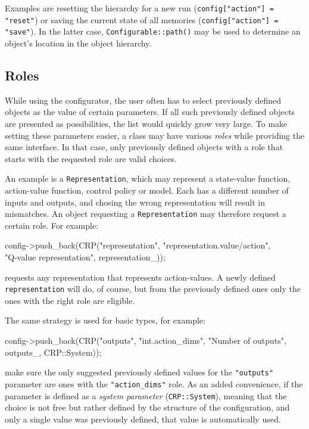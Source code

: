 \documentclass{article}
\newcommand{\txt}[1]{\texttt{#1}}
\newenvironment{code}{\alltt}{\endalltt}
\begin{document}
Examples are resetting the hierarchy for a new run (\txt{config["action"] =
"reset"}) or saving the current state of all memories (\txt{config["action"]
= "save"}). In the latter case, \txt{Configurable::path()} may be used to
determine an object's location in the object hierarchy.

\subsection{Roles}

While using the configurator, the user often has to select previously
defined objects as the value of certain parameters. If all such previously
defined objects are presented as possibilities, the list would quickly grow
very large. To make setting these parameters easier, a class may have
various \emph{roles} while providing the same interface. In that case,
only previously defined objects with a role that starts with the requested
role are valid choices.

An example is a \txt{Representation}, which may represent a state-value function,
action-value function, control policy or model. Each has a different number
of inputs and outputs, and chosing the wrong representation will result in
mismatches. An object requesting a \txt{Representation} may therefore request
a certain role. For example:

\begin{code}
config->push_back(CRP("representation", "representation.value/action",\\
                      "Q-value representation", representation_));
\end{code}

requests any representation that represents action-values. A newly
defined \txt{representation} will do, of course, but from the previously
defined ones only the ones with the right role are eligible.

The same strategy is used for basic types, for example:

\begin{code}
config->push_back(CRP("outputs", "int.action_dims",
                      "Number of outputs", outputs_, CRP::System));
\end{code}

make sure the only suggested previously defined values for the
\txt{"outputs"} parameter are ones with the \txt{"action\_dims"} role. As an added
convenience, if the parameter is defined as a \emph{system parameter}
(\txt{CRP::System}), meaning that the choice is not free but rather defined
by the structure of the configuration, and only a single value was
previously defined, that value is automatically used.
\end{document}
